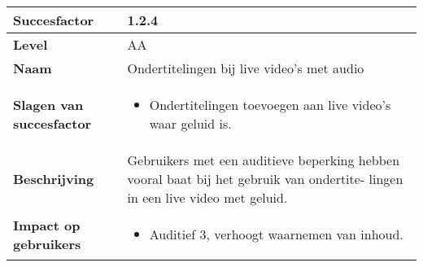 \begin{table}[H]
    \centering
    \hspace*{-1cm}\begin{tabular}{|l|p{12cm}|} 
        \hline
        \textbf{Succesfactor}                & 1.2.4                                                                                                                                                                                                                                                                                                             \\ 
        \hline
        \textbf{Level}                       & AA                                                                                                                                                                                                                                                                                                                                                                             \\ 
        \hline
        \textbf{Naam}                        & Ondertitelingen bij live video’s met audio~                                                                                                                                                                                                                                                                                                                                                            \\ 
        \hline
        \textbf{Slagen van succesfactor}     & \begin{itemize}
            \item Ondertitelingen toevoegen aan live video’s waar geluid is.
        \end{itemize}                                                                                                                                                                                                      \\ 
        \hline
        \textbf{Beschrijving}                & Gebruikers met een auditieve beperking hebben vooral baat bij het gebruik van ondertite- lingen in een live video met geluid.  \\ 
        \hline
        \textbf{Impact op gebruikers}        & 
        \begin{itemize}
            \item Auditief 3, verhoogt waarnemen van inhoud.             
        \end{itemize}                                                                                                                   \\ 

\end{tabular}
\end{table}
